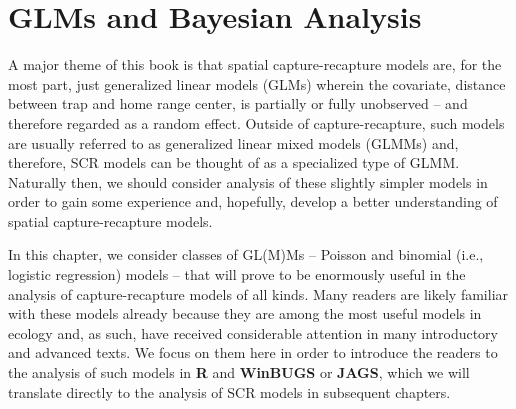 \chapter{
 GLMs and Bayesian Analysis
}
\label{chapt.glms}

\vspace{.3in}




A major theme of this book is that spatial capture-recapture models
are, for the most part, just generalized linear models (GLMs) wherein
the covariate, distance between trap and home range center, is
partially or fully unobserved  -- and therefore regarded as
a random effect. Outside of capture-recapture, such models
are usually referred to as generalized linear mixed models (GLMMs)
and, therefore, SCR models can be thought of as a specialized type of
GLMM. Naturally then, we should consider analysis of these slightly
simpler models in order to gain some experience and, hopefully,
develop a better understanding of spatial capture-recapture models.

In this chapter, we consider classes of GL(M)Ms -- Poisson and
binomial (i.e., logistic regression) models -- that will prove to be
enormously useful in the analysis of capture-recapture models of all
kinds. Many readers are likely familiar with these models already because
they are among
the most useful models in ecology and, as
such, have received considerable attention in many introductory and
advanced texts. We focus on them here in order to introduce the
readers to the analysis of such models in {\bf R} and {\bf WinBUGS} or
{\bf JAGS},
which we will
translate directly to the analysis of SCR models in subsequent
chapters.


